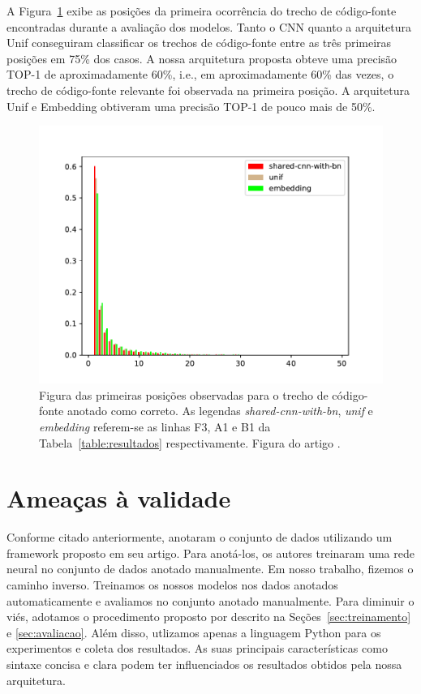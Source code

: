 A Figura~\ref{fig:histogram-mrr} exibe as posições da primeira ocorrência do trecho de código-fonte encontradas durante a avaliação dos modelos. Tanto o CNN quanto a arquitetura Unif conseguiram classificar os trechos de código-fonte entre as três primeiras posições em 75\% dos casos. A nossa arquitetura proposta obteve uma precisão TOP-1 de aproximadamente 60\%, i.e., em aproximadamente 60\% das vezes, o trecho de código-fonte relevante foi observada na primeira posição. A arquitetura Unif e Embedding obtiveram uma precisão TOP-1 de pouco mais de 50\%. 


\begin{figure}[h]
    \centering
    \includegraphics[width=1\textwidth]{figuras/cap-resultados/histogram.pdf}
    \caption[Figura das primeiras posições observadas para o trecho de código-fonte anotado como correto.]{Figura das primeiras posições observadas para o trecho de código-fonte anotado como correto. As legendas \emph{shared-cnn-with-bn}, \emph{unif} e \emph{embedding} referem-se as linhas F3, A1 e B1 da Tabela~\ref{table:resultados} respectivamente. Figura do artigo \cite{martins2020concra}.}
    \label{fig:histogram-mrr}
\end{figure}

\section{Ameaças à validade}

Conforme citado anteriormente, \cite{yao-2018} anotaram o conjunto de dados utilizando um framework proposto em seu artigo. Para anotá-los, os autores treinaram uma rede neural no conjunto de dados anotado manualmente. Em nosso trabalho, fizemos o caminho inverso. Treinamos os nossos modelos nos dados anotados automaticamente e avaliamos no conjunto anotado manualmente. Para diminuir o viés, adotamos o procedimento proposto por \cite{iyer-etal-2016-summarizing} descrito na Seções~\ref{sec:treinamento} e \ref{sec:avaliacao}.
Além disso, utlizamos apenas a linguagem Python para os experimentos e coleta dos resultados. As suas principais características como sintaxe concisa e clara podem ter influenciados os resultados obtidos pela nossa arquitetura. 


